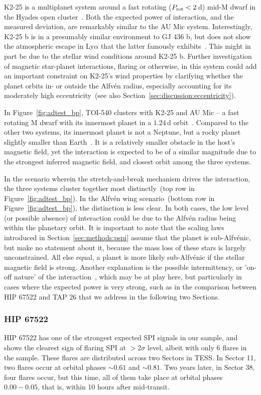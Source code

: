 \documentclass[twocolumn]{aastex631}
\begin{document}
K2-25 is a multiplanet system around a fast rotating ($P_{\rm rot}<2\,$d) mid-M dwarf in the Hyades open cluster~\citep[600-800 Myr, ][]{stefansson2020habitable}. Both the expected power of interaction, and the measured deviation, are remarkably similar to the AU Mic system. Interestingly, K2-25 b is in a presumably similar environment to GJ 436 b, but does not show the atmospheric escape in Ly$\alpha$ that the latter famously exhibits~\citep{rockcliffe2021lya}. This might in part be due to the stellar wind conditions around K2-25 b. Further investigation of magnetic star-planet interactions, flaring or otherwise, in this system could add an important constraint on K2-25's wind properties by clarifying whether the planet orbits in- or outside the Alfv\'en radius, especially accounting for its moderately high eccentricity~(see also Section~\ref{sec:discussion:eccentricity}).

In Figure~\ref{fig:adtest_bp}, TOI-540 clusters with K2-25 and AU Mic -- a fast rotating M dwarf with its innermost planet in a $1.24\,$d orbit~\citep{ment2021toi}. Compared to the other two systems, its innermost planet is not a Neptune, but a rocky planet slightly smaller than Earth~\citep{ment2021toi}. It is a relatively smaller obstacle in the host's magnetic field, yet the interaction is expected to be of a similar magnitude due to the strongest inferred magnetic field, and closest orbit among the three systems. 

In the scenario wherein the stretch-and-break mechanism drives the interaction, the three systems cluster together most distinctly~(top row in Figure~\ref{fig:adtest_bp}). In the Alfv\'en wing scenario~(bottom row in Figure~\ref{fig:adtest_bp}), the distinction is less clear. In both cases, the low level (or possible absence) of interaction could be due to the Alfv\'en radius being within the planetary orbit. It is important to note that the scaling laws introduced in Section~\ref{sec:methods:pspi} assume that the planet is sub-Alfv\'enic, but make no statement about it, because the mass loss of these stars is largely unconstrained. All else equal, a planet is more likely sub-Alfv\'enic if the stellar magnetic field is strong. Another explanation is the possible intermittency, or 'on-off nature' of the interaction~\citep{shkolnik2008nature}, which may be at play here, but particularly in cases where the expected power is very strong, such as in the comparison between HIP 67522 and TAP 26 that we address in the following two Sections.

\subsubsection{HIP 67522}
\label{sec:results:individualstars:hip67522}
HIP 67522 has one of the strongest expected SPI signals in our sample, and shows the clearest sign of flaring SPI at $>2\sigma$ level, albeit with only 6 flares in the sample. These flares are distributed across two Sectors in TESS. In Sector 11, two flares occur at orbital phases $\sim 0.61$ and $\sim 0.81$. Two years later, in Sector 38, four flares occur, but this time, all of them take place at orbital phases $0.00-0.05$, that is, within 10 hours after mid-transit.
\end{document}
